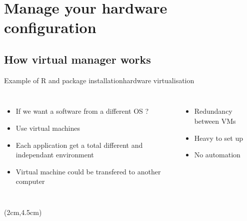 \section{Manage your hardware configuration}
\subsection{How virtual manager works}

\begin{frame}{Example of R and package installation}{hardware virtualisation}
\begin{columns}
\begin{itemize}[<+->]
	\item If we want a software from a different OS ?
	\item Use virtual machines
	\item Each application get a total different and independant environment
	\item Virtual machine could be transfered to another computer
\end{itemize}
\begin{itemize}[<+->]
	\item Redundancy between VMs
	\item Heavy to set up
	\item No automation
\end{itemize}
\end{columns}
\begin{textblock*}{10cm}(2cm,4.5cm) %
\end{textblock*}
\end{frame}

